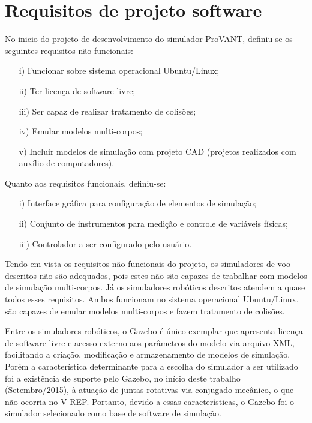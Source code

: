 \section{Requisitos de projeto software}


No inicio do projeto de desenvolvimento do simulador ProVANT, definiu-se os seguintes requisitos não funcionais:

\begin{itemize}
	\itemsep0em
	\item[i)] Funcionar sobre sistema operacional Ubuntu/Linux;
	\item[ii)] Ter licen\c ca de software livre;
	\item[iii)] Ser capaz de realizar tratamento de colis\~oes;
	\item[iv)] Emular modelos multi-corpos;
	\item[v)] Incluir modelos de simulação com projeto CAD (projetos realizados com auxílio de computadores).
\end{itemize}	


Quanto aos requisitos funcionais, definiu-se:

\begin{itemize}
	\itemsep0em
	\item[i)] Interface gráfica para configuração de elementos de simulação;
	\item[ii)] Conjunto de instrumentos para medição e controle de variáveis físicas; 
	\item[iii)] Controlador a ser configurado pelo usuário. 
\end{itemize} 

Tendo em vista os requisitos não funcionais do projeto, os simuladores de voo descritos não são adequados, pois estes não são capazes de trabalhar com modelos de simulação multi-corpos. Já os simuladores robóticos descritos atendem a quase todos esses requisitos. Ambos funcionam no sistema operacional Ubuntu/Linux, são capazes de emular modelos multi-corpos e fazem tratamento de colisões. 


Entre os simuladores robóticos, o Gazebo é único exemplar que apresenta licença de software livre e acesso externo aos parâmetros do modelo via arquivo XML, facilitando a criação, modificação e armazenamento de modelos de simulação. Porém a característica determinante para a escolha do simulador a ser utilizado foi a existência de suporte pelo Gazebo, no início deste trabalho (Setembro/2015), à atuação de juntas rotativas via conjugado mecânico, o que não ocorria no V-REP. Portanto, devido a essas características, o Gazebo foi o simulador selecionado como base de software de simulação.

